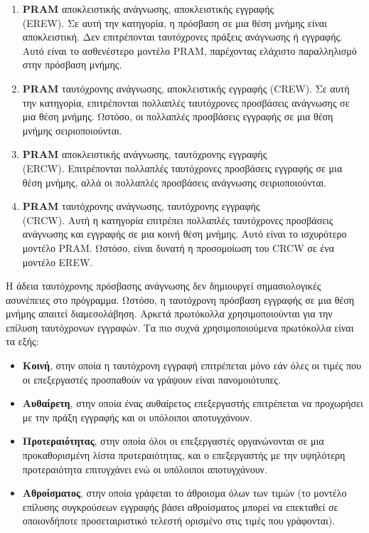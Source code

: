 \documentclass[12pt,a4paper]{article} %
\begin{document}
\begin{enumerate}
    \item \textbf{PRAM} αποκλειστικής ανάγνωσης, αποκλειστικής εγγραφής\\ (EREW).
    Σε αυτή την κατηγορία, η πρόσβαση σε μια θέση μνήμης είναι αποκλειστική.
    Δεν επιτρέπονται ταυτόχρονες πράξεις ανάγνωσης ή εγγραφής. Αυτό είναι το
    ασθενέστερο μοντέλο PRAM, παρέχοντας ελάχιστο
    παραλληλισμό στην πρόσβαση μνήμης.

    \item \sloppy \textbf{PRAM} ταυτόχρονης ανάγνωσης, αποκλειστικής εγγραφής (CREW).
    Σε αυτή την κατηγορία, επιτρέπονται πολλαπλές ταυτόχρονες προσβάσεις
    ανάγνωσης σε μια θέση μνήμης. Ωστόσο, οι πολλαπλές προσβάσεις εγγραφής
    σε μια θέση μνήμης σειριοποιούνται.

    \item \textbf{PRAM} αποκλειστικής ανάγνωσης, ταυτόχρονης εγγραφής\\ (ERCW).
    Επιτρέπονται πολλαπλές ταυτόχρονες προσβάσεις εγγραφής σε μια θέση μνήμης,
    αλλά οι πολλαπλές προσβάσεις ανάγνωσης σειριοποιούνται.

    \item \textbf{PRAM} ταυτόχρονης ανάγνωσης, ταυτόχρονης εγγραφής\\ (CRCW).
    Αυτή η κατηγορία επιτρέπει πολλαπλές ταυτόχρονες προσβάσεις ανάγνωσης και
    εγγραφής σε μια κοινή θέση μνήμης. Αυτό είναι το ισχυρότερο μοντέλο PRAM.
    Ωστόσο, είναι δυνατή η προσομοίωση του CRCW σε ένα μοντέλο EREW.
\end{enumerate}

Η άδεια ταυτόχρονης πρόσβασης ανάγνωσης δεν δημιουργεί σημασιολογικές
ασυνέπειες στο πρόγραμμα. Ωστόσο, η ταυτόχρονη πρόσβαση εγγραφής σε μια θέση
μνήμης απαιτεί διαμεσολάβηση. Αρκετά πρωτόκολλα χρησιμοποιούνται για την επίλυση
ταυτόχρονων εγγραφών. Τα πιο συχνά χρησιμοποιούμενα πρωτόκολλα είναι τα εξής:

\begin{itemize}
    \item \textbf{Κοινή}, στην οποία η ταυτόχρονη εγγραφή επιτρέπεται μόνο εάν όλες
    οι τιμές που οι επεξεργαστές προσπαθούν να γράψουν είναι πανομοιότυπες.

    \item \textbf{Αυθαίρετη}, στην οποία ένας αυθαίρετος επεξεργαστής επιτρέπεται να
    προχωρήσει με την πράξη εγγραφής και οι υπόλοιποι αποτυγχάνουν.

    \item \textbf{Προτεραιότητας}, στην οποία όλοι οι επεξεργαστές οργανώνονται σε μια
    προκαθορισμένη λίστα προτεραιότητας, και ο επεξεργαστής με την υψηλότερη
    προτεραιότητα επιτυγχάνει ενώ οι υπόλοιποι αποτυγχάνουν.

    \item \textbf{Αθροίσματος}, στην οποία γράφεται το άθροισμα όλων των τιμών (το
    μοντέλο επίλυσης συγκρούσεων εγγραφής βάσει αθροίσματος μπορεί να επεκταθεί
    σε οποιονδήποτε προσεταιριστικό τελεστή ορισμένο στις τιμές που γράφονται).
\end{itemize}
\end{document}
